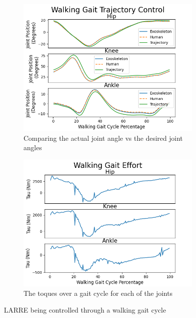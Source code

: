  
 \begin{figure}[h!]
    \begin{subfigure}{0.5\textwidth}
        \centering
        \includegraphics[scale=.5]{images/sim/walkjoints.png}
        \caption{Comparing the actual joint angle vs the desired joint angles}
        \label{fig:simwalkingTraj}
    \end{subfigure}
    \begin{subfigure}{0.5\textwidth}
        \centering
        \includegraphics[scale=.5]{images/sim/walktau.png}
        \caption{The toques over a gait cycle for each of the joints}
    \label{fig:simwalkingtorque}
\end{subfigure}
    \caption[LARRE Simulation Gait Kinematics]{LARRE being controlled through a walking gait cycle}
    \label{fig:simwalking}
\end{figure}
 
